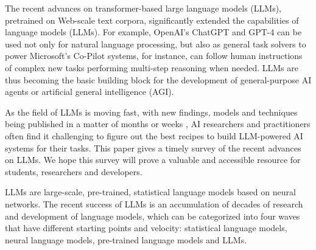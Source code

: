 \documentclass[conference]{IEEEtran}
\begin{document}
The recent advances on transformer-based large language models (LLMs), pretrained on Web-scale text corpora, significantly extended the capabilities of language models (LLMs). For example, OpenAI's ChatGPT and GPT-4 can be used not only for natural language processing, but also as general task solvers to power Microsoft's Co-Pilot systems, for instance, can follow human instructions of complex new tasks performing multi-step reasoning when needed. LLMs are thus becoming the basic building block for the development of general-purpose AI agents or artificial general intelligence (AGI).

As the field of LLMs is moving fast, with new findings, models and techniques being published in a matter of months or weeks \cite{zhao2023survey,zhou2023comprehensive,liu2023pre,dong2022survey,huang2022towards}, AI researchers and practitioners often find it challenging to figure out the best recipes to build LLM-powered AI systems for their tasks. This paper gives a timely survey of the recent advances on LLMs. 
We hope this survey will prove a valuable and accessible resource for students, researchers and developers.

LLMs are large-scale, pre-trained, statistical language models based on neural networks. The recent success of LLMs is an accumulation of decades of research and development of language models, which can be categorized into four waves that have different starting points and velocity: statistical language models, neural language models, pre-trained language models and LLMs.
\end{document}
